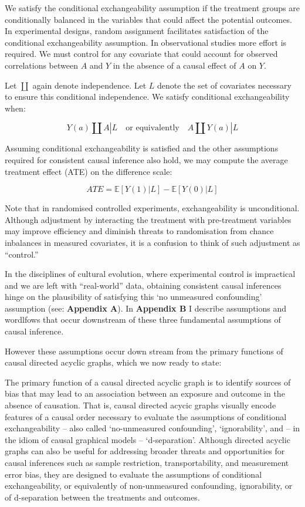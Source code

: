 \documentclass[
  single column]{article}
\begin{document}
We satisfy the conditional exchangeability assumption if the treatment
groups are conditionally balanced in the variables that could affect the
potential outcomes. In experimental designs, random assignment
facilitates satisfaction of the conditional exchangeability assumption.
In observational studies more effort is required. We must control for
any covariate that could account for observed correlations between \(A\)
and \(Y\) in the absence of a causal effect of \(A\) on \(Y\).

Let \(\coprod\) again denote independence. Let \(L\) denote the set of
covariates necessary to ensure this conditional independence. We satisfy
conditional exchangeability when:

\[
Y(a) \coprod A | L \quad \text{or equivalently} \quad A \coprod Y(a) | L
\]

Assuming conditional exchangeability is satisfied and the other
assumptions required for consistent causal inference also hold, we may
compute the average treatment effect (ATE) on the difference scale:

\[
ATE = \mathbb{E}[Y(1) | L] - \mathbb{E}[Y(0) | L]
\]

Note that in randomised controlled experiments, exchangeability is
unconditional. Although adjustment by interacting the treatment with
pre-treatment variables may improve efficiency and diminish threats to
randomisation from chance inbalances in measured covariates, it is a
confusion to think of such adjustment as ``control.''

In the disciplines of cultural evolution, where experimental control is
impractical and we are left with ``real-world'' data, obtaining
consistent causal inferences hinge on the plausibility of satisfying
this `no unmeasured confounding' assumption (see: \textbf{Appendix A}).
In \textbf{Appendix B} I describe assumptions and wordlfows that occur
downstream of these three fundamental assumptions of causal inference.

However these assumptions occur down stream from the primary functions
of causal directed acyclic graphs, which we now ready to state:

The primary function of a causal directed acyclic graph is to identify
sources of bias that may lead to an association between an exposure and
outcome in the absence of causation. That is, causal directed acycic
graphs visually encode features of a causal order necessary to evaluate
the assumptions of conditional exchangeability -- also called
`no-unmeasured confounding', `ignorability', and -- in the idiom of
causal graphical models -- `d-separation'. Although directed acyclic
graphs can also be useful for addressing broader threats and
opportunities for causal inferences such as sample restriction,
transportability, and measurement error bias, they are designed to
evaluate the assumptions of conditional exchangeability, or equivalently
of non-unmeasured confounding, ignorability, or of d-separation between
the treatments and outcomes.
\end{document}

